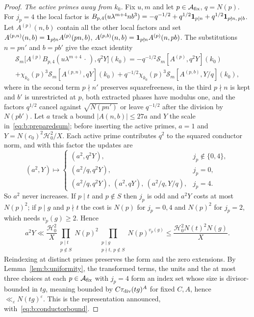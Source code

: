 \begin{proof}
\emph{The active primes away from $k_0$.} Fix $u,m$ and let $p\in\mathcal A_{\rm fix}$, $q=N(p)$. For $j_p=4$ the local factor is $B_{p,4}(u\lambda^{m+4}nb^3)=-q^{-1/2}+q^{1/2}\mathbf{1}_{p\mid n}+q^{1/2}\mathbf{1}_{p\nmid n,\,p\mid b}$. Let $A^{(p)}(n,b)$ contain all the other local factors and set $A^{(p,n)}(n,b)=\mathbf{1}_{p\nmid n}A^{(p)}(pn,b)$, $A^{(p,b)}(n,b)=\mathbf{1}_{p\nmid n}A^{(p)}(n,pb)$. The substitutions $n=pn'$ and $b=pb'$ give the exact identity
\begin{multline*}
  \mathscr S_m\bigl[A^{(p)}B_{p,4}(u\lambda^{m+4}\,\cdot\,),q^2Y\bigr](k_0)=-q^{-1/2}\mathscr S_m[A^{(p)},q^2Y](k_0)\\
  +\chi_{k_0}(p)^3\mathscr S_m[A^{(p,n)},qY](k_0)+q^{-1/2}\chi_{k_0}(p)^3\mathscr S_m[A^{(p,b)},Y/q](k_0),
\end{multline*}
where in the second term $p\nmid n'$ preserves squarefreeness, in the third $p\nmid n$ is kept and $b'$ is unrestricted at $p$, both extracted phases have modulus one, and the factors $q^{1/2}$ cancel against $\sqrt{N(pn')}$ or leave $q^{-1/2}$ after the division by $N(pb')$. Let $a$ track a bound $|A(n,b)|\le27a$ and $Y$ the scale in~\eqref{eq:b:preparedsum}; before inserting the active primes, $a=1$ and $Y=N(c_0)^2\mathcal H_0^2/X$. Each active prime contributes $q^2$ to the squared conductor norm, and with this factor the updates are
\[
  (a^2,Y)\longmapsto\begin{cases}(a^2,q^2Y),&j_p\notin\{0,4\},\\(a^2/q,q^2Y),&j_p=0,\\(a^2/q,q^2Y),\ (a^2,qY),\ (a^2/q,Y/q),&j_p=4.\end{cases}
\]
So $a^2$ never increases. If $p\mid t$ and $p\notin S$ then $j_p$ is odd and $a^2Y$ costs at most $N(p)^2$; if $p\mid g$ and $p\nmid t$ the cost is $N(p)$ for $j_p=0,4$ and $N(p)^2$ for $j_p=2$, which needs $v_p(g)\ge2$. Hence
\[
  a^2Y\ll\frac{\mathcal H_0^2}X\prod_{\substack{p\mid t\\p\notin S}}N(p)^2\prod_{\substack{p\mid g\\p\nmid t,\ p\notin S}}N(p)^{v_p(g)}\le\frac{\mathcal H_0^2N(t)^2N(g)}X.
\]
Reindexing at distinct primes preserves the form and the zero extensions. By Lemma~\ref{lem:b:uniformity}, the transformed terms, the units and the at most three choices at each $p\in\mathcal A_{\rm fix}$ with $j_p=4$ form an index set whose size is divisor-bounded in $tg$, meaning bounded by $C\tau_{\rm div}(tg)^A$ for fixed $C,A$, hence $\ll_\varepsilon N(tg)^\varepsilon$. This is the representation announced, with~\eqref{eq:b:conductorbound}.


\end{proof}
